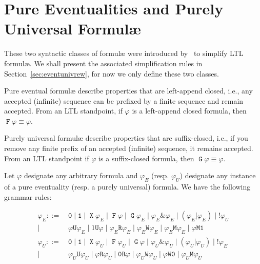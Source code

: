 \documentclass[a4paper,twoside,10pt,DIV=12,draft]{scrreprt}
\DeclareMathOperator{\F}{\texttt{F}}
\DeclareMathOperator{\G}{\texttt{G}}
\newcommand{\U}{\mathbin{\texttt{U}}}
\newcommand{\R}{\mathbin{\texttt{R}}}
\DeclareMathOperator{\X}{\texttt{X}}
\newcommand{\M}{\mathbin{\texttt{M}}}
\newcommand{\W}{\mathbin{\texttt{W}}}
\DeclareMathOperator{\NOT}{\texttt{!}}
\newcommand{\OR}{\mathbin{\texttt{|}}}
\newcommand{\AND}{\mathbin{\texttt{\&}}}
\newcommand{\0}{\texttt{0}}
\newcommand{\1}{\texttt{1}}
\begin{document}
\section{Pure Eventualities and Purely Universal Formul\ae{}}
\label{sec:eventuniv}

These two syntactic classes of formul\ae{} were introduced
by~\citet{etessami.00.concur} to simplify LTL formul\ae{}.  We shall
present the associated simplification rules in
Section~\ref{sec:eventunivrew}, for now we only define these two
classes.

Pure eventual formul\ae{} describe properties that are left-append
closed, i.e., any accepted (infinite) sequence can be prefixed by a
finite sequence and remain accepted.  From an LTL standpoint, if
$\varphi$ is a left-append closed formula, then $\F\varphi \equiv
\varphi$.

Purely universal formul\ae{} describe properties that are
suffix-closed, i.e., if you remove any finite prefix of an accepted
(infinite) sequence, it remains accepted.  From an LTL standpoint if
$\varphi$ is a suffix-closed formula, then $\G\varphi \equiv \varphi$.


Let $\varphi$ designate any arbitrary formula and $\varphi_E$
(resp. $\varphi_U$) designate any instance of a pure eventuality
(resp. a purely universal) formula.  We have the following grammar
rules:

\begin{align*}
  \varphi_E ::=&\, \0
           \mid \1
           \mid \X \varphi_E
           \mid \F \varphi
           \mid \G \varphi_E
           \mid \varphi_E\AND \varphi_E
           \mid (\varphi_E\OR \varphi_E)
           \mid \NOT\varphi_U\\
           \mid&\,\varphi  \U \varphi_E
           \mid 1        \U \varphi
           \mid \varphi_E\R \varphi_E
           \mid \varphi_E\W \varphi_E
           \mid \varphi_E\M \varphi_E
           \mid \varphi  \M \1\\
  \varphi_U ::=&\, \0
           \mid \1
           \mid \X \varphi_U
           \mid \F \varphi_U
           \mid \G \varphi
           \mid \varphi_U\AND \varphi_U
           \mid (\varphi_U\OR \varphi_U)
           \mid \NOT\varphi_E\\
           \mid&\,\varphi_U\U \varphi_U
           \mid \varphi  \R \varphi_U
           \mid \0       \R \varphi
           \mid \varphi_U\W \varphi_U
           \mid \varphi  \W \0
           \mid \varphi_U\M \varphi_U\\
\end{align*}
\end{document}
